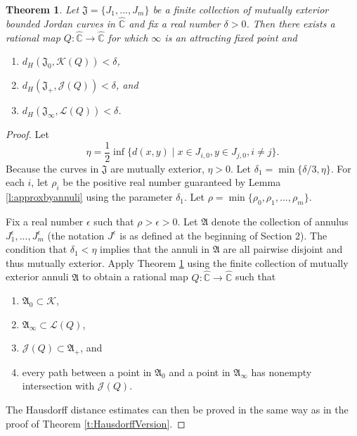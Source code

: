 \documentclass[a4paper,11pt,onecolumn]{amsart}
\newtheorem{theorem}{Theorem}[section]
\theoremstyle{definition}
\begin{document}
  \begin{theorem}  \label{t:HausdorffVersionRational}
  Let $\mathfrak{J}=\{J_1,...,J_m\}$ be a finite collection of mutually exterior bounded Jordan curves in $\hat{\mathbb{C}}$ and fix a real number $\delta>0$.  Then there exists a rational map $Q:\hat{\mathbb{C}} \rightarrow \hat{\mathbb{C}}$ for which $\infty$ is an attracting fixed point and 
  \begin{enumerate}
  \item $d_H(\mathfrak{J}_0,\mathcal{K}(Q)) < \delta$,
  \item $d_H(\mathfrak{J}_+,\mathcal{J}(Q)) < \delta$, and
  \item $d_H(\mathfrak{J}_{\infty},\mathcal{L}(Q))<\delta$.
  \end{enumerate}
  \end{theorem}
  
  \begin{proof}
  Let $$\eta = \frac{1}{2} \inf \{ d(x,y) \mid x \in J_{i,0}, y \in J_{j,0}, i \not = j\}.$$  Because the curves in $\mathfrak{J}$ are mutually exterior, $\eta >0$.    Let $\delta_1 = \min\{\delta/3, \eta\}$.   For each $i$, let $\rho_i$ be the positive real number guaranteed by Lemma \ref{l:approxbyannuli} using the parameter $\delta_1$.   Let $\rho = \min\{\rho_0,\rho_1,...,\rho_m\}$.  
  
  Fix a real number $\epsilon$ such that $\rho > \epsilon >0$.  Let $\mathfrak{A}$ denote the collection of annulus $J^{\epsilon}_1,...,J^{\epsilon}_m$ (the notation $J^{\epsilon}$ is as defined at the beginning of Section 2).  The condition that $\delta_1 < \eta$ implies that the annuli in $\mathfrak{A}$ are all pairwise disjoint and thus mutually exterior.  Apply Theorem \ref{t:HausdorffVersionRational} using the finite collection of mutually exterior annuli $\mathfrak{A}$ to obtain a rational map $Q:\hat{\mathbb{C}} \rightarrow \hat{\mathbb{C}}$ such that 
  \begin{enumerate}
 \item $\mathfrak{A}_0 \subset \mathcal{K}$, 
\item  $\mathfrak{A}_{\infty} \subset \mathcal{L}(Q)$, 
\item $\mathcal{J}(Q) \subset \mathfrak{A}_+$, and
\item every path between a point in $\mathfrak{A}_0$ and a point in $\mathfrak{A}_{\infty}$ has nonempty intersection with $\mathcal{J}(Q)$.  
  \end{enumerate}
The Hausdorff distance estimates can then be proved in the same way as in the proof of  Theorem  \ref{t:HausdorffVersion}.
  \end{proof}
  
\end{document}
